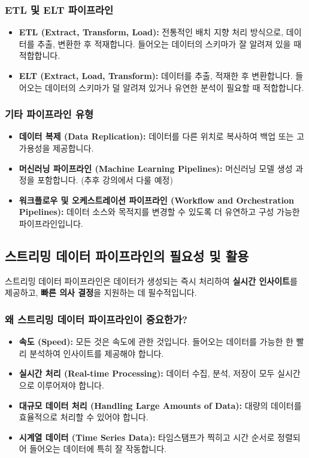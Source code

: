 \documentclass[11pt,a4paper]{article}
\begin{document}
\subsubsection{ETL 및 ELT 파이프라인}
\begin{itemize}
    \item \textbf{ETL (Extract, Transform, Load):} 전통적인 배치 지향 처리 방식으로, 데이터를 추출, 변환한 후 적재합니다. 들어오는 데이터의 스키마가 잘 알려져 있을 때 적합합니다.
    \item \textbf{ELT (Extract, Load, Transform):} 데이터를 추출, 적재한 후 변환합니다. 들어오는 데이터의 스키마가 덜 알려져 있거나 유연한 분석이 필요할 때 적합합니다.
\end{itemize}

\subsubsection{기타 파이프라인 유형}
\begin{itemize}
    \item \textbf{데이터 복제 (Data Replication):} 데이터를 다른 위치로 복사하여 백업 또는 고가용성을 제공합니다.
    \item \textbf{머신러닝 파이프라인 (Machine Learning Pipelines):} 머신러닝 모델 생성 과정을 포함합니다. (추후 강의에서 다룰 예정)
    \item \textbf{워크플로우 및 오케스트레이션 파이프라인 (Workflow and Orchestration Pipelines):} 데이터 소스와 목적지를 변경할 수 있도록 더 유연하고 구성 가능한 파이프라인입니다.
\end{itemize}

\subsection{스트리밍 데이터 파이프라인의 필요성 및 활용}

\begin{conceptbox}
스트리밍 데이터 파이프라인은 데이터가 생성되는 즉시 처리하여 \textbf{실시간 인사이트}를 제공하고, \textbf{빠른 의사 결정}을 지원하는 데 필수적입니다.
\end{conceptbox}

\subsubsection{왜 스트리밍 데이터 파이프라인이 중요한가?}
\begin{itemize}
    \item \textbf{속도 (Speed):} 모든 것은 속도에 관한 것입니다. 들어오는 데이터를 가능한 한 빨리 분석하여 인사이트를 제공해야 합니다.
    \item \textbf{실시간 처리 (Real-time Processing):} 데이터 수집, 분석, 저장이 모두 실시간으로 이루어져야 합니다.
    \item \textbf{대규모 데이터 처리 (Handling Large Amounts of Data):} 대량의 데이터를 효율적으로 처리할 수 있어야 합니다.
    \item \textbf{시계열 데이터 (Time Series Data):} 타임스탬프가 찍히고 시간 순서로 정렬되어 들어오는 데이터에 특히 잘 작동합니다.
\end{itemize}
\end{document}
